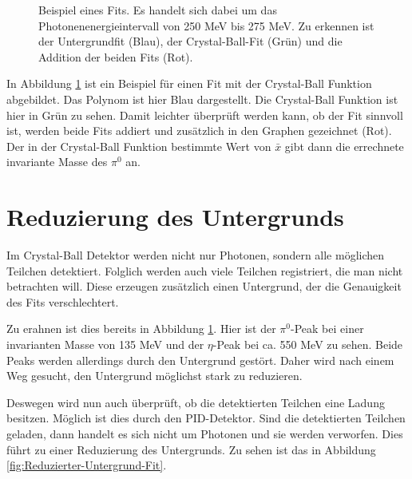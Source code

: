 \documentclass[a4paper,11pt,oneside,final,german,openbib,pdftex]{scrbook}
\begin{document}
{\begin{figure}[h!]
\begin{center}
		\caption[Strahlzeit: Beispielfit f\"ur die Crystal-Ball-Fitfunktion]{Beispiel eines Fits. Es handelt sich dabei um das Photonenenergieintervall von 250 MeV bis 275 MeV.
			Zu erkennen ist der Untergrundfit (Blau), der Crystal-Ball-Fit (Gr\"un) und die Addition der beiden Fits (Rot). %
		}
		\label{fig:fitexampleenergyinterval0903}	
	\end{center}
\end{figure}

In Abbildung \ref{fig:fitexampleenergyinterval0903} ist ein Beispiel f\"ur einen Fit mit der Crystal-Ball Funktion abgebildet. Das Polynom ist hier Blau dargestellt. Die Crystal-Ball Funktion ist hier in Gr\"un zu sehen. Damit leichter \"uberpr\"uft werden kann, ob der Fit sinnvoll ist, werden beide Fits addiert und zus\"atzlich in den Graphen gezeichnet (Rot). Der in der Crystal-Ball Funktion bestimmte Wert von $\bar{x}$ gibt dann die errechnete invariante Masse des $\pi^0$ an.


\section{Reduzierung des Untergrunds}

Im Crystal-Ball Detektor werden nicht nur Photonen, sondern alle m\"oglichen Teilchen detektiert. Folglich werden auch viele Teilchen registriert, die man nicht betrachten will. Diese erzeugen zus\"atzlich einen Untergrund, der die Genauigkeit des Fits verschlechtert.

Zu erahnen ist dies bereits in Abbildung \ref{fig:fitexampleenergyinterval0903}. Hier ist der $\pi^0$-Peak bei einer invarianten Masse von 135 MeV und der $\eta$-Peak bei ca. 550 MeV zu sehen. Beide Peaks werden allerdings durch den Untergrund gest\"ort. %
 Daher wird nach einem Weg gesucht, den Untergrund m\"oglichst stark zu reduzieren. 

Deswegen wird nun auch \"uberpr\"uft, ob die detektierten Teilchen eine Ladung besitzen. M\"oglich ist dies durch den PID-Detektor. Sind die detektierten Teilchen geladen, dann handelt es sich nicht um Photonen und sie werden verworfen. Dies f\"uhrt zu einer Reduzierung des Untergrunds. Zu sehen ist das in Abbildung \ref{fig:Reduzierter-Untergrund-Fit}.


}
\end{document}
